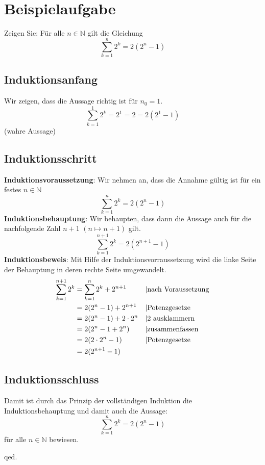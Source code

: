 \section{Beispielaufgabe}
Zeigen Sie: Für alle $ n \in \mathbb{N} $ gilt die Gleichung 
\[\sum_{k=1}^{n} 2^k = 2(2^n - 1)\]
\subsection{Induktionsanfang}
Wir zeigen, dass die Aussage richtig ist für $ n_0 = 1 $.
	\[\sum_{k=1}^{1} 2^k = 2^1 = 2 = 2(2^1 - 1) \] (wahre Aussage)
\subsection{Induktionsschritt}
\textbf{Induktionsvoraussetzung}: Wir nehmen an, dass die Annahme gültig ist für ein festes $ n \in \mathbb{N} $
	\[\sum_{k=1}^{n} 2^k = 2(2^n-1)\]
\textbf{Induktionsbehauptung}: Wir behaupten, dass dann die Aussage auch für die nachfolgende Zahl $ n+1 $ $(n \mapsto n+1) $ gilt.
	\[\sum_{k=1}^{n+1} 2^k = 2(2^{n+1} - 1)\]
\textbf{Induktionsbeweis}: Mit Hilfe der Induktionsvorraussetzung wird die linke Seite der Behauptung in deren rechte Seite umgewandelt.
\begin{align*}
	\sum_{k=1}^{n+1} 2^k 	&= \sum_{k=1}^{n} 2^k + 2^{n+1}		&& \text{\textbar nach Voraussetzung} 	\\
												&= 2(2^n - 1) + 2^{n+1} 					&& \text{\textbar Potenzgesetze} 			\\
												&= 2(2^n-1)+2\cdot2^n 						&& \text{\textbar 2 ausklammern} 			\\
												&= 2(2^n - 1 + 2^n) 							&& \text{\textbar zusammenfassen} 			\\
												&= 2(2 \cdot 2^n - 1) 						&& \text{\textbar Potenzgesetze} 			\\
												&= 2(2^{n+1} - 1)											
\end{align*}
\subsection{Induktionsschluss}
Damit ist durch das Prinzip der vollständigen Induktion die Induktionsbehauptung und damit auch die Aussage: 
	\[\sum_{k=1}^{n} 2^k = 2(2^n - 1)\]
 für alle $ n \in \mathbb{N} $ bewiesen.
\begin{center}
qed.
\end{center}

